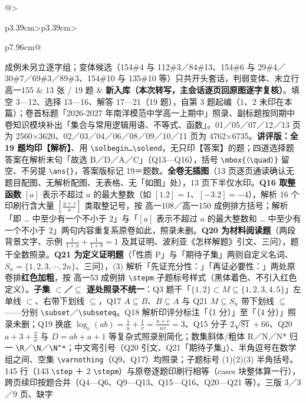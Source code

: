 \documentclass[a4paper,11pt]{article}
\begin{document}
\begin{xltabular}{\textwidth}{@{}>{\raggedright\arraybackslash}p{3.39cm}>{\centering\arraybackslash}p{3.39cm}>{\raggedright\arraybackslash}p{7.96cm}@{}}
成例未另立逐字组；变体候选（154\#4 与 112\#3／84\#13、154\#6 与 29\#4／30\#7／69\#3／89\#3、154\#10 与 135\#10 等）只共开头套话，判弱变体、未立行 \\ \addlinespace[1pt]
高一155 & 13 张 / 19 题 & \textbf{新入库（本次转写，主会话逐页回原图逐字复核）}。填空 3---12、选择 13---16、解答 17---21（19 题），自第 3 题起编（1、2 未印在本篇）；卷首标题「2026-2027 年南洋模范中学高一上期中」照录、副标题按同期中卷知识模块补出「集合与常用逻辑用语、不等式、函数」。01／05／07／12／13 页为 2560$\times$3620、02／03／04／06／08／09／10／11 页为 4762$\times$6735。\textbf{讲评版：全 19 题均印【解析】}、用 \texttt{\textbackslash{}solbegin…\textbackslash{}solend}，无只印【答案】的题；四道选择题答案在解析末句「故选 B／D／A／C」（Q13---Q16），括号 \texttt{\textbackslash{}mbox\{（\textbackslash{}quad）\}} 留空、不另提 \texttt{\textbackslash{}ans\{\}}，答案版标记 19＝题数。\textbf{全卷无插图}（13 页逐页通读确认无题目配图、无解析配图、无表格、无「如图」处），13 页下半仅水印。\textbf{Q16 取整函数} \([a]\) 表示不超过 \(a\) 的最大整数（如 \([1.2]=\allowbreak 1\)、\([-3.2]=\allowbreak -4\)），解析 16 个印刷行含大量 \(\left[\frac{y+z}{x}\right]\) 类取整记号，按 高一108／高一150 成例排方括号；解析「即 \ldots{} 中至少有一个不小于 2」与「\([a]\) 表示不超过 \(a\) 的最大整数和 \ldots{} 中至少有一个不小于 2」两句内容重复系原卷如此，照录未删。\textbf{Q20 为材料阅读题}（两段背景文字、示例 \(\frac1{1+a}+\allowbreak \frac1{1+b}=\allowbreak 1\) 及其证明、波利亚《怎样解题》引文、三问），题干全数照录。\textbf{Q21 为定义证明题}（「性质 P」与「期待子集」两则自定义名词、\(S_n=\allowbreak \{1,\allowbreak 2,\allowbreak 3,\allowbreak \cdots,\allowbreak 2n\}\)、三问），(3) 解析「先证充分性：」「再证必要性：」两处原卷排\textbf{红色加粗}，按 高一53 成例排 \texttt{\textbackslash{}stepm} 子题标号样式（黑体着色、不引入红色定义）。\textbf{子集 $\subset$／$\subseteq$ 逐处照录不统一}：Q3 题干「\(\{1,\allowbreak 2\}\subset\allowbreak  M\subseteq\allowbreak \{1,\allowbreak 2,\allowbreak 3,\allowbreak 4,\allowbreak 5\}\)」左单线 $\subset$、右带下划线 $\subseteq$，Q17 \(A\subseteq\allowbreak  B\)、\(B\subseteq\allowbreak  A\) 与 Q21 \(M\subseteq\allowbreak  S_n\) 带下划线 $\subseteq$------分别 \texttt{\textbackslash{}subset}／\texttt{\textbackslash{}subseteq}。Q18 解析印评分标注「（1 分）」至「（4 分）」照录未删；Q19 换底 \(\log_c(ab)=\allowbreak \frac1u+\allowbreak \frac1v=\allowbreak \frac{u+v}{uv}=\allowbreak 3\)、Q15 分子 \(2\sqrt{81}+\allowbreak 66\)、Q20 \(a+\allowbreak 3+\allowbreak \frac2a\) 与 \(D=ab+a+\allowbreak 1\) 等复杂式照录别简化；数集斜体/粗体 R／N／N* 归一 \texttt{\textbackslash{}R}／\texttt{\textbackslash{}N}／\texttt{\textbackslash{}N\^{}*}；中文弯引号（Q20 引文、Q21「期待子集」）、半角逗号在数学组之间、空集 \texttt{\textbackslash{}varnothing}（Q9、Q17）均照录；子题标号 (1)(2)(3) 半角括号。145 行（143 \texttt{\textbackslash{}step} ＋ 2 \texttt{\textbackslash{}stepm}）与原卷逐题印刷行相等（cases 块整体算一行），跨页续印按题合并（Q4---Q6、Q9---Q13、Q15---Q16、Q20---Q21 等）。三版 3／3／9 页、缺字 
\end{xltabular}
\end{document}
